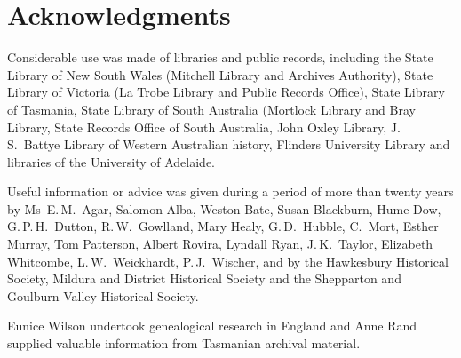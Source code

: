 
\chapter{Acknowledgments}
\label{ch:ack}

Considerable use was made of libraries and public records, including
the State Library of New South Wales (Mitchell Library and Archives
Authority), State Library of Victoria (La Trobe Library and Public
Records Office), State Library of Tasmania, State Library of South
Australia (Mortlock Library and Bray Library, State Records Office of
South Australia, John Oxley Library, J.\,S.~Battye Library of Western
Australian history, Flinders University Library and libraries of the
University of Adelaide.

Useful information or advice was given during a period of more than
twenty years by Ms~E.\,M.~Agar, Salomon Alba, Weston Bate, Susan
Blackburn, Hume Dow, G.\,P.\,H.~Dutton, R.\,W.~Gowlland, Mary Healy,
G.\,D.~Hubble, C.~Mort, Esther Murray, Tom Patterson, Albert Rovira,
Lyndall Ryan, J.\,K.~Taylor, Elizabeth Whitcombe, L.\,W.~Weickhardt,
P.\,J.~Wischer, and by the Hawkesbury Historical Society, Mildura and
District Historical Society and the Shepparton and Goulburn Valley
Historical Society.

Eunice Wilson undertook genealogical research in England and Anne Rand
supplied valuable information from Tasmanian archival material.
